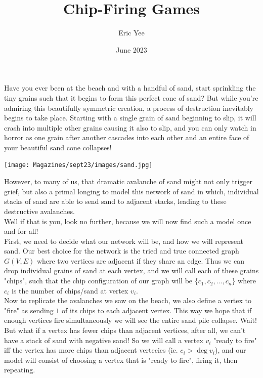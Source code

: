 \documentclass{article}
\title{Chip-Firing Games}
\author{Eric Yee}
\date{June 2023}
\begin{document}
\maketitle
Have you ever been at the beach and with a handful of sand, start sprinkling the tiny grains such that it begins to form this perfect cone of sand? But while you're admiring this beautifully symmetric creation, a process of destruction inevitably begins to take place. Starting with a single grain of sand beginning to slip, it will crash into multiple other grains causing it also to slip, and you can only watch in horror as one grain after another cascades into each other and an entire face of your beautiful sand cone collapses! \\

\begin{center}
    \texttt{[image: Magazines/sept23/images/sand.jpg]}
\end{center}

However, to many of us, that dramatic avalanche of sand might not only trigger grief, but also a primal longing to model this network of sand in which, individual stacks of sand are able to send sand to adjacent stacks, leading to these destructive avalanches.\\

Well if that is you, look no further, because we will now find such a model once and for all!\\

First, we need to decide what our network will be, and how we will represent sand. Our best choice for the network is the tried and true connected graph $G(V,E)$ where two vertices are adjacent if they share an edge. Thus we can drop individual grains of sand at each vertex, and we will call each of these grains "chips", such that the chip configuration of our graph will be $\{c_1,c_2,...,c_n\}$ where $c_i$ is the number of chips/sand at vertex $v_i$.\\

Now to replicate the avalanches we saw on the beach, we also define a vertex to "fire" as sending $1$ of its chips to each adjacent vertex. This way we hope that if enough vertices fire simultaneously we will see the entire sand pile collapse. Wait! But what if a vertex has fewer chips than adjacent vertices, after all, we can't have a stack of sand with negative sand! So we will call a vertex $v_i$ "ready to fire" iff the vertex has more chips than adjacent vertecies (ie. $c_i>\deg{v_i}$), and our model will consist of choosing a vertex that is "ready to fire", firing it, then repeating.\\
\end{document}
